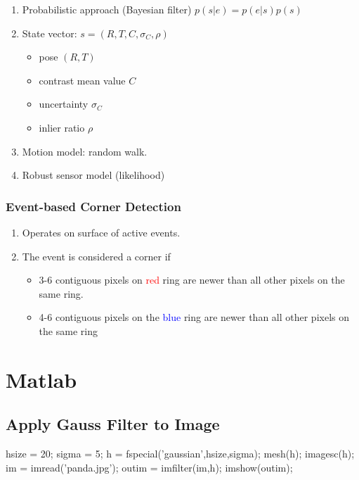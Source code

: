\documentclass[10pt,a4paper]{scrartcl}
\begin{document}
\begin{multicols*}{2}
\begin{enumerate}
\item Probabilistic approach (Bayesian filter) $p(s|e)=p(e|s)p(s)$
\item State vector: $s=(R,T,C,\sigma_C,\rho)$
\begin{itemize}
\item pose $(R,T)$
\item contrast mean value $C$
\item uncertainty $\sigma_C$
\item inlier ratio $\rho$
\end{itemize}
\item Motion model: random walk.
\item Robust sensor model (likelihood)
\end{enumerate}

\subsubsection{Event-based Corner Detection}


\begin{enumerate}
\item Operates on surface of active events.
\item The event is considered a corner if
\begin{itemize}
\item 3-6 contiguous pixels on \textcolor{red}{red} ring are newer than all other pixels on the same ring.
\item 4-6 contiguous pixels on the \textcolor{blue}{blue} ring are newer than all other pixels on the same ring
\end{itemize}
\end{enumerate}

\section{Matlab}

\subsection{Apply Gauss Filter to Image}

\begin{TPMatlab}
hsize = 20;
sigma = 5;
h = fspecial('gaussian',hsize,sigma);
mesh(h); %
imagesc(h); %
im = imread('panda.jpg');
outim = imfilter(im,h);
imshow(outim);
\end{TPMatlab}


\end{multicols*}
\end{document}
